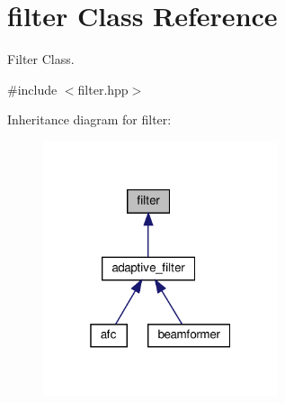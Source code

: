 \hypertarget{classfilter}{}\section{filter Class Reference}
\label{classfilter}


Filter Class.  




{\ttfamily \#include $<$filter.\+hpp$>$}



Inheritance diagram for filter\+:\nopagebreak
\begin{figure}[H]
\begin{center}
\leavevmode
\includegraphics[width=196pt]{classfilter__inherit__graph}
\end{center}
\end{figure}
